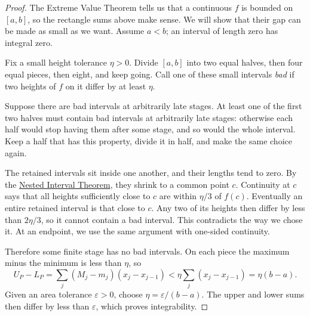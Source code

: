 \begin{proof}
The Extreme Value Theorem tells us that a continuous $f$ is bounded
on $[a,b]$, so the rectangle sums above make sense. We will show that
their gap can be made as small as we want. Assume $a<b$; an interval
of length zero has integral zero.

Fix a small height tolerance $\eta>0$. Divide $[a,b]$ into two equal
halves, then four equal pieces, then eight, and keep going. Call one of
these small intervals \textit{bad} if two heights of $f$ on it differ
by at least $\eta$.

Suppose there are bad intervals at arbitrarily late stages. At least one
of the first two halves must contain bad intervals at arbitrarily late
stages: otherwise each half would stop having them after some stage,
and so would the whole interval. Keep a half that has this property,
divide it in half, and make the same choice again.

The retained intervals sit inside one another, and their lengths tend
to zero. By the
\hyperref[sec:nested-interval-theorem]{Nested Interval Theorem}, they
shrink to a common point $c$. Continuity at $c$ says that all heights
sufficiently close to $c$ are within $\eta/3$ of $f(c)$. Eventually an
entire retained interval is that close to $c$. Any two of its heights
then differ by less than $2\eta/3$, so it cannot contain a bad interval.
This contradicts the way we chose it. At an endpoint, we use the same
argument with one-sided continuity.

Therefore some finite stage has no bad intervals. On each piece the
maximum minus the minimum is less than $\eta$, so
$$
U_P-L_P
=\sum_j(M_j-m_j)(x_j-x_{j-1})
<\eta\sum_j(x_j-x_{j-1})=\eta(b-a).
$$
Given an area tolerance $\varepsilon>0$, choose
$\eta=\varepsilon/(b-a)$. The upper and lower sums then differ by less
than $\varepsilon$, which proves integrability.
\end{proof}


